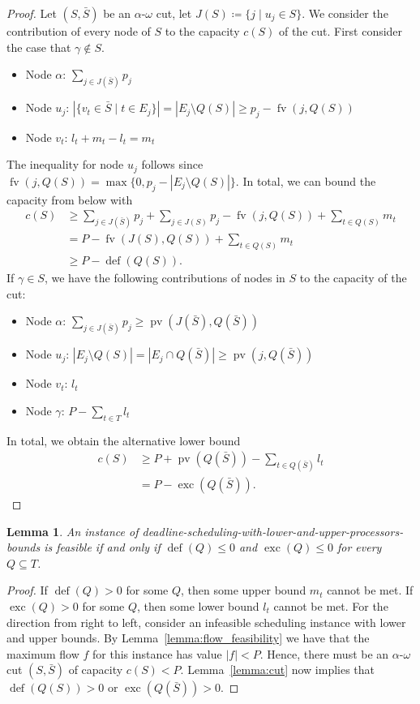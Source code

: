\documentclass[a4paper]{article}
\DeclareMathOperator{\fv}{fv}
\DeclareMathOperator{\pv}{pv}
\DeclareMathOperator{\opdef}{def}
\DeclareMathOperator{\exc}{exc}
\newtheorem{lemma}[theorem]{Lemma}
\begin{document}
\begin{proof}
  Let $(S, \bar S)$ be an $\alpha$-$\omega$ cut, let $J(S) \coloneqq \{j \mid u_j \in S\}$.
  We consider the contribution of every node of $S$ to the capacity $c(S)$ of the cut.
  First consider the case that $\gamma \notin S$.
  \begin{itemize}
    \item Node $\alpha$: $\sum_{j \in J(\bar S)} p_j$
    \item Node $u_j$: $|\{v_t \in \bar S \mid t \in E_j\}| = | E_j \setminus Q(S) | \geq p_j - \fv(j, Q(S))$
    \item Node $v_t$: $l_t + m_t - l_t = m_t$
  \end{itemize}
  The inequality for node $u_j$ follows since $\fv(j, Q(S)) = \max \{0, p_j - |E_j \setminus Q(S)| \}$.
  In total, we can bound the capacity from below with
  \begin{align}
    c(S) &\geq \sum_{j \in J(\bar S)} p_j + \sum_{j \in J(S)} p_j - \fv(j, Q(S)) + \sum_{t \in Q(S)} m_t
    \\ &= P - \fv(J(S), Q(S)) + \sum_{t \in Q(S)} m_t
    \\ &\geq P - \opdef(Q(S))\text{.}
  \end{align}
  If $\gamma \in S$, we have the following contributions of nodes in $S$ to the capacity of the cut:
  \begin{itemize}
    \item Node $\alpha$: $\sum_{j \in J(\bar S)} p_j \geq \pv(J(\bar S), Q(\bar S))$
    \item Node $u_j$: $| E_j \setminus Q(S) |
      = | E_j \cap Q(\bar S)| \geq \pv(j, Q(\bar S))$
    \item Node $v_t$: $l_t$
    \item Node $\gamma$: $P - \sum_{t \in T} l_t$
  \end{itemize}
  In total, we obtain the alternative lower bound
  \begin{align}
    c(S) &\geq P + \pv(Q(\bar S))
    - \sum_{t \in Q(\bar S)} l_t
    \\ &= P - \exc(Q(\bar S)) \text{.}
  \end{align}

\end{proof}

\begin{lemma}\label{lemma:feasibility}
  An instance of deadline-scheduling-with-lower-and-upper-processors-bounds is feasible if and only if $\opdef(Q) \leq 0$ and $\exc(Q) \leq 0$ for every $Q \subseteq T$.
\end{lemma}
\begin{proof}
  If $\opdef(Q) > 0$ for some $Q$, then some upper bound $m_t$ cannot be met.
  If $\exc(Q) > 0$ for some $Q$, then some lower bound $l_t$ cannot be met.
  For the direction from right to left, consider an infeasible scheduling instance with lower and upper bounds.
  By Lemma~\ref{lemma:flow_feasibility} we have that the maximum flow $f$ for this instance has value $|f| < P$.
  Hence, there must be an $\alpha$-$\omega$ cut $(S, \bar S)$ of capacity $c(S) < P$.
  Lemma~\ref{lemma:cut} now implies that $\opdef(Q(S)) > 0$ or $\exc(Q(\bar S)) > 0$.
\end{proof}
\end{document}
